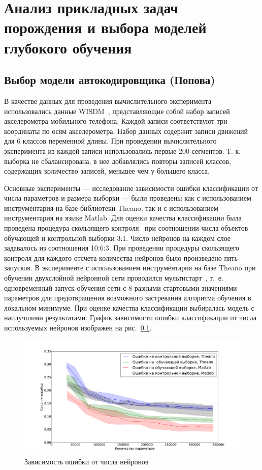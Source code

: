 \chapter*{Анализ прикладных задач порождения и выбора моделей глубокого
обучения}
\section{Выбор модели автокодировщика (Попова)}
В качестве данных для проведения вычислительного эксперимента использовались данные WISDM~\cite{wisdm}, представляющие собой набор записей акселерометра мобильного телефона. Каждой записи соответствуют три координаты по осям акселерометра. Набор данных содержит записи движений для 6 классов переменной длины.
При проведении вычислительного эксперимента из каждой записи использовались первые 200 сегментов. Т. к. выборка не сбалансирована, в нее добавлялись повторы записей классов, содержащих количество записей, меньшее чем у большего класса.

Основные эксперименты --- исследование зависимости ошибки классификации от числа параметров и размера выборки --- были проведены как с использованием инструментария на базе библиотеки Theano, так и с использованием инструментария на языке Matlab.
Для оценки качества классификации была проведена процедура скользящего контроля~\cite{cv} при соотношении числа объектов обучающей и контрольной выборки 3:1. Число нейронов на каждом слое задавалось из соотношения 10:6:3. При проведении процедуры скользящего контроля для каждого отсчета количества нейронов было произведено пять запусков. В эксперименте с использованием инструментария на базе Theano при обучении двухслойной нейронной сети проводился мультистарт~\cite{multi}, т.~е. одновременный запуск обучения сети с 8 разными стартовыми значениями параметров для предотвращения возможного застревания алгоритма обучения в локальном минимуме. При оценке качества классификации выбиралась модель с наилучшими результатами. График зависимости ошибки классификации от числа используемых нейронов изображен на рис.~\ref{fig:neurons}.



\begin{figure}[tb!]
 \centering
  \includegraphics[width=1.0\textwidth]{plots/popova/neurons.pdf}
 \caption{Зависимость ошибки     от числа нейронов}
 \label{fig:neurons}
\end{figure}


